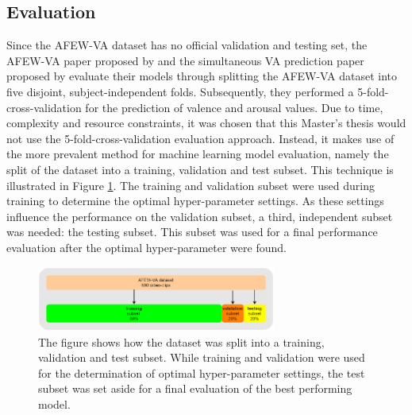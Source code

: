 \subsection{Evaluation} \label{sec:TrainValTestSplit}
Since the AFEW-VA dataset has no official validation and testing set, the AFEW-VA paper proposed by \citet{Kossaifi:2017:AFEW-VADatabase} and the simultaneous VA prediction paper proposed by \citet{Handrich:2020:SimultaneousPredVA} evaluate their models through splitting the AFEW-VA dataset into five disjoint, subject-independent folds. Subsequently, they performed a 5-fold-cross-validation for the prediction of valence and arousal values. 
\newline\newline
Due to time, complexity and resource constraints, it was chosen that this Master's thesis would not use the 5-fold-cross-validation evaluation approach. Instead, it makes use of the more prevalent method for machine learning model evaluation, namely the split of the dataset into a training, validation and test subset. This technique is illustrated in Figure \ref{fig:TrainValTestSplit}. The training and validation subset were used during training to determine the optimal hyper-parameter settings. As these settings influence the performance on the validation subset, a third, independent subset was needed: the testing subset. This subset was used for a final performance evaluation after the optimal hyper-parameter were found.

\begin{figure}[H]
  \begin{center}
  \includegraphics[angle=0, width=0.7\textwidth]{Figures/TrainValTestSplit.png}
  \caption[Dataset training-validation-test split]{The figure shows how the dataset was split into a training, validation and test subset. While training and validation were used for the determination of optimal hyper-parameter settings, the test subset was set aside for a final evaluation of the best performing model.}
  \label{fig:TrainValTestSplit}
  \end{center}
\end{figure}

